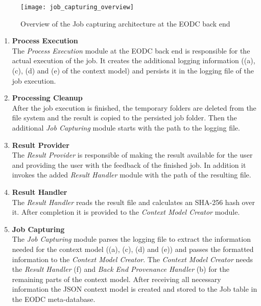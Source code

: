 \documentclass[draft,final]{vutinfth} %
\begin{document}
\begin{figure}[h]
	\centering
	\texttt{[image: job\_capturing\_overview]}
	\caption{Overview of the Job capturing architecture at the EODC back end}
	\label{fig:impljobcapture} %
\end{figure}

\begin{enumerate}
	\item \textbf{Process Execution} \\
	The \textit{Process Execution} module at the EODC back end is responsible for the actual execution of the job. It creates the additional logging information ((a), (c), (d) and (e) of the context model) and persists it in the logging file of the job execution. 
	\item \textbf{Processing Cleanup} \\
	After the job execution is finished, the temporary folders are deleted from the file system and the result is copied to the persisted job folder. Then the additional \textit{Job Capturing} module starts with the path to the logging file.  
	\item \textbf{Result Provider} \\
	The \textit{Result Provider} is responsible of making the result available for the user and providing the user with the feedback of the finished job. In addition it invokes the added \textit{Result Handler} module with the path of the resulting file.
	\item \textbf{Result Handler} \\
	The \textit{Result Handler} reads the result file and calculates an SHA-256 hash over it. After completion it is provided to the \textit{Context Model Creator} module.  
	\item \textbf{Job Capturing} \\
	The \textit{Job Capturing} module parses the logging file to extract the information needed for the context model ((a), (c), (d) and (e)) and passes the formatted information to the \textit{Context Model Creator}. The \textit{Context Model Creator} needs the \textit{Result Handler} (f) and \textit{Back End Provenance Handler} (b) for the remaining parts of the context model. After receiving all necessary information the JSON context model is created and stored to the Job table in the EODC meta-database.    
\end{enumerate}
\end{document}
